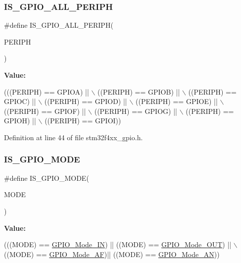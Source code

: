 \subsubsection{\texorpdfstring{I\+S\+\_\+\+G\+P\+I\+O\+\_\+\+A\+L\+L\+\_\+\+P\+E\+R\+I\+PH}{IS\_GPIO\_ALL\_PERIPH}}
{\footnotesize\ttfamily \#define I\+S\+\_\+\+G\+P\+I\+O\+\_\+\+A\+L\+L\+\_\+\+P\+E\+R\+I\+PH(\begin{DoxyParamCaption}\item[{}]{P\+E\+R\+I\+PH }\end{DoxyParamCaption})}

{\bfseries Value\+:}
\begin{DoxyCode}
(((PERIPH) == GPIOA) || \(\backslash\)
                                    ((PERIPH) == GPIOB) || \(\backslash\)
                                    ((PERIPH) == GPIOC) || \(\backslash\)
                                    ((PERIPH) == GPIOD) || \(\backslash\)
                                    ((PERIPH) == GPIOE) || \(\backslash\)
                                    ((PERIPH) == GPIOF) || \(\backslash\)
                                    ((PERIPH) == GPIOG) || \(\backslash\)
                                    ((PERIPH) == GPIOH) || \(\backslash\)
                                    ((PERIPH) == GPIOI))
\end{DoxyCode}


Definition at line 44 of file stm32f4xx\+\_\+gpio.\+h.

\mbox{\label{group___g_p_i_o_gacc5fde3eef57ec3c558c11d0011d900c}} 
\subsubsection{\texorpdfstring{I\+S\+\_\+\+G\+P\+I\+O\+\_\+\+M\+O\+DE}{IS\_GPIO\_MODE}}
{\footnotesize\ttfamily \#define I\+S\+\_\+\+G\+P\+I\+O\+\_\+\+M\+O\+DE(\begin{DoxyParamCaption}\item[{}]{M\+O\+DE }\end{DoxyParamCaption})}

{\bfseries Value\+:}
\begin{DoxyCode}
(((MODE) == \hyperlink{group___g_p_i_o_gga1347339e1c84a196fabbb31205eec5d4a484aa18a6156ce916049b334ba1839de}{GPIO\_Mode\_IN})  || ((MODE) == \hyperlink{group___g_p_i_o_gga1347339e1c84a196fabbb31205eec5d4a60f1d530f4119efcad8e1a68c890c6a6}{GPIO\_Mode\_OUT}) || \(\backslash\)
                            ((MODE) == \hyperlink{group___g_p_i_o_gga1347339e1c84a196fabbb31205eec5d4a6d44c35c6c5008d85bac9251a867e701}{GPIO\_Mode\_AF})|| ((MODE) == 
      \hyperlink{group___g_p_i_o_gga1347339e1c84a196fabbb31205eec5d4a6e5c0d7e6d2e22b834b24e1ca1d6d0db}{GPIO\_Mode\_AN}))
\end{DoxyCode}


